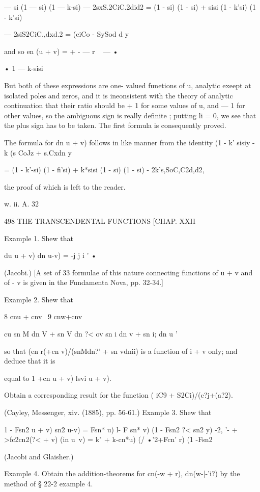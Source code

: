 — si (1 — si) (1 — k-si) — 2sxS.2CiC.2did2 = (1 - si) (1 - si) + sisi
(1 - k'si) (1 - k'si)

— 2siS2CiC.,dxd.2 = (ciCo - SySod d y

and so en (u + v) = + - — r ~ — •

• 1 — k-sisi

But both of these expressions are one- valued funetions of u, analytic
exeept at isolated poles and zeros, and it is ineonsistent with the
theory of analytic continuation that their ratio should be + 1 for
some values of u, and — 1 for other values, so the ambiguous sign is
really definite ; putting li = 0, we see that the plus sign has to be
taken. The first formula is consequently proved.

The formula for dn u + v) follows in like manner from the identity (1
- k' sisiy - k (s CoJz + s.Cxdn y

= (1 - k'-si) (1 - fi'si) + k*sisi (1 - si) (1 - si) -
2k's,SoC,C2d,d2,

the proof of which is left to the reader.

w. ii. A. 32



498 THE TRANSCENDENTAL FUNCTIONS [CHAP. XXII

Example 1. Shew that

du u + v) dn u-v) = -j j i ' •

(Jacobi.) [A set of 33 formulae of this nature connecting functions of
u + v and of - v is given in the Fundamenta Nova, pp. 32-34.]

Example 2. Shew that

8 cnu + cnv \ 9 cnw+cnv

cu sn M dn V + sn V dn ?< ov sn i dn v + sn i; dn u '

so that (en r(+cn v)/(snMdn?' + sn vdnii) is a function of i + v only;
and deduce that it is

equal to 1 +cn u + v) lsvi u + v).

Obtain a corresponding result for the function ( iC9 +
S2Ci)/(c?j+(a?2).

(Cayley, Messenger, xiv. (1885), pp. 56-61.) Example 3. Shew that

1 - Fsn2 u + v) sn2 u-v) = Fsn* u) l- F sn* v) (1 - Fsn2 ?< sn2 y) -2,
'- + >fc2cn2(?< + v) (in u~v) = k" + k-cn*u) (/ •'2+Fcn' r) (1
-Fsn2%

(Jacobi and Glaisher.)

Example 4. Obtain the addition-theorems for cn(-w + r), dn(w-|-'i?) by
the method of § 22-2 example 4.

